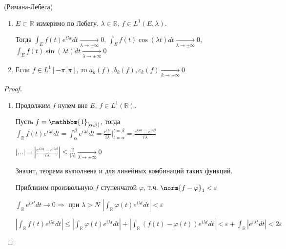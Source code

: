 \begin{lemma}(Римана-Лебега)
    \begin{enumerate}
        \item $E\subset \mathbb{R}$ измеримо по Лебегу, $\lambda \in \mathbb{R}$, $f \in L^1(E, \lambda)$.

              Тогда $\int_E f(t)e^{i\lambda t}dt \underset{\lambda\rightarrow\pm\infty}{\rightarrow} 0$,
              $\int_E f(t)\cos(\lambda t)dt \underset{\lambda\rightarrow\pm\infty}{\rightarrow} 0$,
              $\int_E f(t)\sin(\lambda t)dt \underset{\lambda\rightarrow\pm\infty}{\rightarrow} 0$
        \item Если $f\in L^1[-\pi, \pi]$, то $a_k(f), b_k(f), c_k(f)\underset{k\rightarrow\pm\infty}{\rightarrow} 0$
    \end{enumerate}
\end{lemma}
\begin{proof}
    \begin{enumerate}
        \item Продолжим $f$ нулем вне $E$, $f\in L^1(\mathbb{R})$.

              Пусть $f = \mathbbm{1}_{[\alpha, \beta)}$, тогда $\int_\mathbb{R} f(t)e^{i\lambda t}dt = \int_\alpha^\beta e^{i\lambda t}dt
                  = \frac{e^{i\lambda t}}{i\lambda}\Big|_{t = \alpha}^{t = \beta} = \frac{e^{i\lambda\alpha} -
                      e^{i\lambda \beta}}{i\lambda}$

              $|\ldots| = |\frac{e^{i\lambda\alpha} -
                      e^{i\lambda \beta}}{i\lambda}| \le \frac{2}{|\lambda|}  \underset{\lambda\rightarrow\pm\infty}{\rightarrow} 0$

              Значит, теорема выполнена и для линейных комбинаций таких функций.

              Приблизим произвольную $f$ ступенчатой $\varphi$, т.ч. $\norm{f - \varphi}_1 < \varepsilon$

              $\int_{\mathbb{R}} e^{i\lambda t}dt \rightarrow 0 \Rightarrow $ при $\lambda > N$
              $|\int_\mathbb{R}\varphi(t)e^{i\lambda t}dt| < \varepsilon$

              $|\int_\mathbb{R}f(t)e^{i\lambda t}dt| \le  |\int_\mathbb{R}\varphi(t)e^{i\lambda t}dt| + |\int_\mathbb{R}(f(t) - \varphi(t))e^{i\lambda t}dt| < \varepsilon + \int_\mathbb{R}|e^{i\lambda t}dt| < 2\varepsilon$
    \end{enumerate}


\end{proof}
